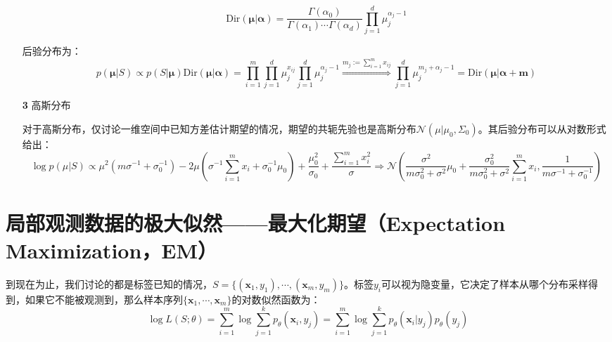 \documentclass{article}
\begin{document}
\begin{itemize}
\begin{scriptsize}
\begin{spacing}{1.2}
{	\begin{equation*}
	\mathrm{Dir} (\bm{\mu}|\bm{\alpha}) = \frac{\Gamma(\alpha_0)}{\Gamma(\alpha_1)\cdots\Gamma(\alpha_d)}  \prod_{j=1}^d \mu_j^{\alpha_j-1}
	\end{equation*}
	
	后验分布为：
	\begin{equation*}
	p(\bm{\mu}|S) \propto p(S|\bm{\mu}) \mathrm{Dir} (\bm{\mu}|\bm{\alpha}) =\prod_{i=1}^m \prod_{j=1}^d \mu_j^{x_{ij}} \prod_{j=1}^d \mu_j^{\alpha_j-1} \overset{m_j:=\sum_{i=1}^m x_{ij}}{\Longrightarrow}  \prod_{j=1}^d \mu_j^{m_j+\alpha_j-1} = \mathrm{Dir} (\bm{\mu}|\bm{\alpha}+\bm{m})
	\end{equation*}
	}
	\end{spacing}
	\end{scriptsize}
	\vspace{-2mm}
	
	\item [\textbf{3}] 高斯分布

	\vspace{1mm}
	\begin{scriptsize}
	\begin{spacing}{1.2}
	{\sffamily
	对于高斯分布，仅讨论一维空间中已知方差估计期望的情况，期望的共轭先验也是高斯分布$\mathcal{N}(\mu|\mu_0, \Sigma_0)$。其后验分布可以从对数形式给出：
	\begin{equation*}
	\log p(\mu|S) \propto \mu^2 (m \sigma^{-1} + \sigma_0^{-1}) - 2 \mu \left(\sigma^{-1} \sum_{i=1}^m x_i + \sigma_0^{-1} \mu_0\right) + \frac{\mu_0^2}{\sigma_0} + \frac{ \sum_{i=1}^mx_i^2}{\sigma} 
	\Longrightarrow \mathcal{N}\left(\frac{\sigma^2}{m\sigma_0^2+\sigma^2}\mu_0 + \frac{\sigma_0^2}{m\sigma_0^2+\sigma^2}\sum_{i=1}^m x_i, \frac{1}{m \sigma^{-1} + \sigma_0^{-1}}\right)
	\end{equation*}

	}
	\end{spacing}
	\end{scriptsize}
	\vspace{-2mm}
	
	\end{itemize}
	
\section{局部观测数据的极大似然——最大化期望（Expectation Maximization，EM）}
	到现在为止，我们讨论的都是标签已知的情况，$S=\{(\bm{x}_1,y_1),\cdots,(\bm{x}_m,y_m)\}$。标签$y_i$可以视为隐变量，它决定了样本从哪个分布采样得到，如果它不能被观测到，那么样本序列$\{\bm{x}_1,\cdots,\bm{x}_m\}$的对数似然函数为：
	\begin{equation}
	\log L(S;\theta) = \sum_{i=1}^m \log \sum_{j=1}^k p_\theta(\bm{x}_i,y_j) = \sum_{i=1}^m \log \sum_{j=1}^k p_\theta(\bm{x}_i|y_j)p_\theta(y_j)
	\end{equation}
	
\end{document}
